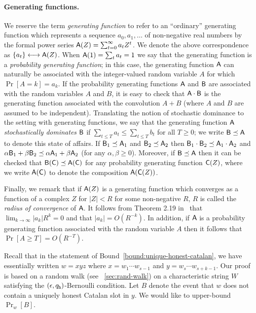 \paragraph{Generating functions.}
  We reserve the term
  \emph{generating function} to refer to an ``ordinary'' generating
  function which represents a sequence $a_0, a_1, \ldots$ of
  non-negative real numbers by the formal power series
  $\mathsf{A}(Z) = \sum_{t = 0}^\infty a_t Z^t$. 
  We denote the above correspondence as $\{a_t\} \longleftrightarrow \mathsf{A}(Z)$. 
  When
  $\mathsf{A}(1) = \sum_t a_t = 1$ we say that the generating function is
  a \emph{probability generating function}; in this case, the
  generating function $\mathsf{A}$ can naturally be associated with the
  integer-valued random variable $A$ for which $\Pr[A = k] = a_k$. If
  the probability generating functions $\mathsf{A}$ and $\mathsf{B}$ are
  associated with the random variables $A$ and $B$, it is easy to
  check that $\mathsf{A} \cdot \mathsf{B}$ is the generating function
  associated with the convolution $A + B$ (where $A$ and $B$ are
  assumed to be independent).  Translating the notion of stochastic
  dominance to the setting with generating functions, we say that the
  generating function $\mathsf{A}$ \emph{stochastically dominates}
  $\mathsf{B}$ if $\sum_{t \leq T} a_t \leq \sum_{t \leq T} b_t$ for all
  $T \geq 0$; we write $\mathsf{B} \preceq \mathsf{A}$ to denote this state of
  affairs. If $\mathsf{B}_1 \preceq \mathsf{A}_1$ and
  $\mathsf{B}_2 \preceq \mathsf{A}_2$ then
  $\mathsf{B}_1 \cdot \mathsf{B}_2 \preceq \mathsf{A}_1 \cdot \mathsf{A}_2$ and
  $\alpha \mathsf{B}_1 + \beta \mathsf{B}_2 \preceq \alpha \mathsf{A}_1 + \beta
  \mathsf{A}_2$ (for any $\alpha, \beta \geq 0$).  Moreover, if
  $\mathsf{B} \preceq \mathsf{A}$ then it can be checked that
  $\mathsf{B}(\mathsf{C}) \preceq \mathsf{A}(\mathsf{C})$ for any probability
  generating function $\mathsf{C}(Z)$, where we write $\mathsf{A}(\mathsf{C})$ to
  denote the composition $\mathsf{A}(\mathsf{C}(Z))$.


  Finally, we remark that
  if $\mathsf{A}(Z)$ is a generating function which converges as a
  function of a complex $Z$ for $|Z| < R$ for some non-negative $R$, 
  $R$ is called the \emph{radius of convergence} of $\mathsf{A}$.  
  It follows from Theorem 2.19 in~\cite{WilfGF} that 
  $\lim_{k \rightarrow \infty} {|a_k|}R^k = 0$ and that $|a_k| = O(R^{-k})$. 
  In addition, if $\mathsf{A}$ is a probability generating function associated with the
  random variable $A$ then it follows that
  $\Pr[A \geq T] = O(R^{-T})$. 

  
  Recall that in the statement of Bound~\ref{bound:unique-honest-catalan}, 
  we have essentially written $w = xyz$ where $x = w_1 \cdots w_{s-1}$ and $y = w_s \cdots w_{s+k-1}$. 
  Our proof is based on a random walk (see \Section~\ref{sec:rand-walk}) 
  on a characteristic string $W$ satisfying the $(\epsilon, q_{\mathtt{h}})$-Bernoulli condition. 
  Let $B$ denote the event that 
  $w$ does not contain a uniquely honest Catalan slot in $y$. 
  We would like to upper-bound $\Pr_w[B]$.

